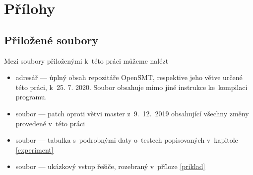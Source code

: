 \documentclass[12pt,a4paper]{report}
\begin{document}



\tableofcontents















\appendix
\chapter{Přílohy}

\section{Přiložené soubory}

Mezi soubory přiloženými k~této práci můžeme nalézt
\begin{itemize}
	\item adresář  --- úplný obsah repozitáře OpenSMT, respektive jeho větve určené této práci, k~25. 7. 2020. Soubor  obsahuje mimo jiné instrukce ke~kompilaci programu.
	\item soubor  --- patch oproti větvi master z~9.~12.~2019 obsahující všechny změny provedené v~této práci
	\item soubor  --- tabulka s~podrobnými daty o~testech popisovaných v~kapitole \ref{experiment}
	\item soubor  --- ukázkový vstup řešiče, rozebraný v~příloze \ref{priklad}
\end{itemize}
\end{document}
